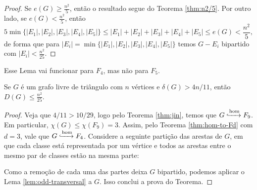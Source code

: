 \begin{proof}
  Se $e(G) \geq \frac{n^2}{5}$, então o resultado segue do Teorema \ref{thm:n2/5}.
  Por outro lado, se $e(G) < \frac{n^2}{5}$, então
    \[ 5 \min\{ |E_1|,|E_2|,|E_3|,|E_4|,|E_5| \} \leq |E_1|+|E_2|+|E_3|+|E_4|+|E_5| \leq e(G) < \frac{n^2}{5}, \]
  de forma que para $|E_i| = \min \{ |E_1|,|E_2|,|E_3|,|E_4|,|E_5| \}$ temos $G-E_i$ bipartido com $|E_i| < \frac{n^2}{25}$.
\end{proof}

Esse Lema vai funcionar para $F_4$, mas não para $F_5$.

\begin{theorem}
  Se $G$ é um grafo livre de triângulo com $n$ vértices e $\delta(G) > 4n/11$, então $D(G) \leq \frac{n^2}{25}$.
\end{theorem}

\begin{proof}
  Veja que $4/11 > 10/29$, logo pelo Teorema \ref{thm:jin}, temos que $G \xhookrightarrow{\text{hom}} F_9$.
  Em particular, $\chi(G) \leq \chi(F_9) = 3$.
  Assim, pelo Teorema \ref{thm:hom-to-Fd} com $d=3$, vale que $G \xhookrightarrow{\text{hom}} F_4$.
  Considere a seguinte partição das arestas de $G$, em que cada classe está representada por um vértice e todos as arestas entre o mesmo par de classes estão na mesma parte:

  \begin{center}
  \end{center}

  Como a remoção de cada uma das partes deixa $G$ bipartido, podemos aplicar o Lema \ref{lem:odd-transversal} a $G$.
  Isso conclui a prova do Teorema. 
\end{proof}
